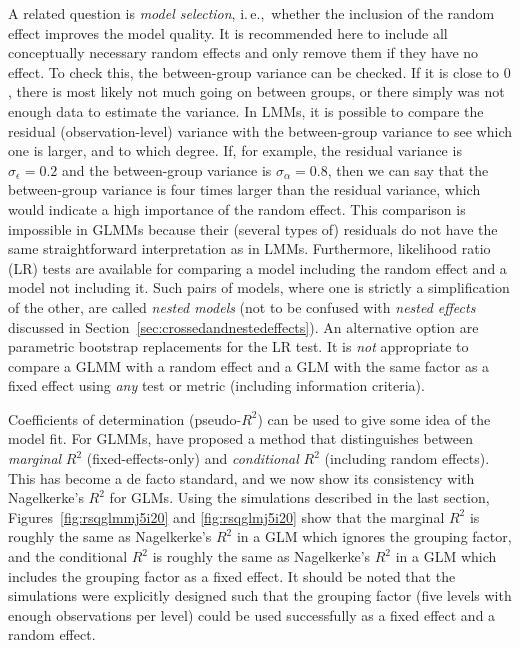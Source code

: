 \documentclass[a4paper,12pt]{article}
\newcommand{\ie}{i.\,e.,\ }
\begin{document}
A related question is \textit{model selection}, \ie whether the inclusion of the random effect improves the model quality.
It is recommended here to include all conceptually necessary random effects and only remove them if they have no effect.
To check this, the between-group variance can be checked.
If it is close to $0$, there is most likely not much going on between groups, or there simply was not enough data to estimate the variance.
In LMMs, it is possible to compare the residual (observation-level) variance with the between-group variance to see which one is larger, and to which degree.
If, for example, the residual variance is $\sigma_{\epsilon}=0.2$ and the between-group variance is $\sigma_{\alpha}=0.8$, then we can say that the between-group variance is four times larger than the residual variance, which would indicate a high importance of the random effect.
This comparison is impossible in GLMMs because their (several types of) residuals do not have the same straightforward interpretation as in LMMs.
Furthermore, likelihood ratio (LR) tests are available for comparing a model including the random effect and a model not including it.
Such pairs of models, where one is strictly a simplification of the other, are called \textit{nested models} (not to be confused with \textit{nested effects} discussed in Section~\ref{sec:crossedandnestedeffects}).
An alternative option are parametric bootstrap replacements for the LR test.
It is \textit{not} appropriate to compare a GLMM with a random effect and a GLM with the same factor as a fixed effect using \textit{any} test or metric (including information criteria).

Coefficients of determination (pseudo-$R^2$) can be used to give some idea of the model fit.
For GLMMs, \citet{NakagawaSchielzeth2013} have proposed a method that distinguishes between \textit{marginal} $R^2$ (fixed-effects-only) and \textit{conditional} $R^2$ (including random effects).
This has become a de facto standard, and we now show its consistency with Nagelkerke's $R^2$ for GLMs.
Using the simulations described in the last section, Figures~\ref{fig:rsqglmmj5i20} and \ref{fig:rsqglmj5i20} show that the marginal $R^2$ is roughly the same as Nagelkerke's $R^2$ in a GLM which ignores the grouping factor, and the conditional $R^2$ is roughly the same as Nagelkerke's $R^2$ in a GLM which includes the grouping factor as a fixed effect.
It should be noted that the simulations were explicitly designed such that the grouping factor (five levels with enough observations per level) could be used successfully as a fixed effect and a random effect.
\end{document}
